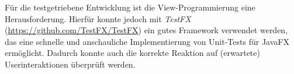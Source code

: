 Für die testgetriebene Entwicklung ist die View-Programmierung eine Herausforderung. Hierfür konnte jedoch mit \emph{TestFX} (\url{https://github.com/TestFX/TestFX}) ein gutes Framework verwendet werden, das eine schnelle und anschauliche Implementierung von Unit-Tests für JavaFX ermöglicht. Dadurch konnte auch die korrekte Reaktion auf (erwartete) Userinteraktionen überprüft werden.
